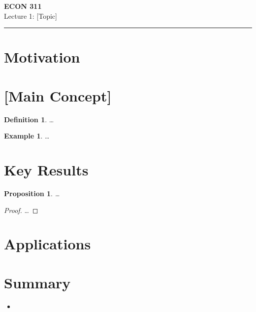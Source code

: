 \documentclass[11pt]{article}
\newtheorem{proposition}[theorem]{Proposition}
\theoremstyle{definition}
\newtheorem{definition}[theorem]{Definition}
\newtheorem{example}[theorem]{Example}
\theoremstyle{remark}
\begin{document}
\begin{center}
  {\LARGE\bfseries ECON 311}\\[0.4em]
  {\large Lecture 1: [Topic]}
\end{center}
\medskip\hrule\medskip

\section{Motivation}

\section{[Main Concept]}

\begin{definition}
  \ldots
\end{definition}

\begin{example}
  \ldots
\end{example}

\section{Key Results}

\begin{proposition}
  \ldots
\end{proposition}

\begin{proof}
  \ldots
\end{proof}

\section{Applications}

\section{Summary}

\begin{itemize}
  \item
\end{itemize}
\end{document}
